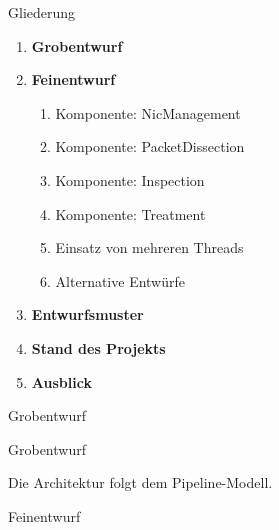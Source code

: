 \documentclass{beamer}
\begin{document}
\begin{frame}{Gliederung}
    \begin{enumerate}
        \item \textbf{Grobentwurf}
        \item \textbf{Feinentwurf}
              \begin{enumerate}
                  \item Komponente: NicManagement
                  \item Komponente: PacketDissection
                  \item Komponente: Inspection
                  \item Komponente: Treatment
                  \item Einsatz von mehreren Threads
                  \item Alternative Entwürfe
              \end{enumerate}
        \item \textbf{Entwurfsmuster}
        \item \textbf{Stand des Projekts}
        \item \textbf{Ausblick}
    \end{enumerate}
\end{frame}

\begin{frame}{Grobentwurf}
    \begin{center}
    \end{center}
\end{frame}

\begin{frame}{Grobentwurf}
    \begin{center}
    Die Architektur folgt dem Pipeline-Modell.
    \end{center}
\end{frame}

\begin{frame}{Feinentwurf}
\end{frame}
\end{document}
